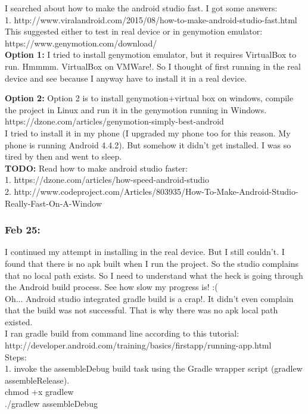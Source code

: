 \documentclass[11pt]{article}
\begin{document}
I searched about how to make the android studio fast. I got some answers:\\
1. http://www.viralandroid.com/2015/08/how-to-make-android-studio-fast.html\\
This suggested either to test in real device or in genymotion emulator: https://www.genymotion.com/download/\\

\textbf{Option 1: } I tried to install genymotion emulator, but it requires VirtualBox to run. Hmmmm. VirtualBox on VMWare!. So I thought of 
first running in the real device and see because I anyway have to install it in a real device.

\textbf{Option 2: } Option 2 is to install genymotion+virtual box on windows, compile the project in Linux and run it in the genymotion 
running in Windows. https://dzone.com/articles/genymotion-simply-best-android \\

I tried to install it in my phone (I upgraded my phone too for this reason. My phone is running Android 4.4.2). But somehow it didn't get installed.
I was so tired by then and went to sleep.\\

\textbf{TODO:}
Read how to make android studio faster:\\
1. https://dzone.com/articles/how-speed-android-studio\\
2. http://www.codeproject.com/Articles/803935/How-To-Make-Android-Studio-Really-Fast-On-A-Window\\


\subsubsection*{Feb 25:}
I continued my attempt in installing in the real device. But I still couldn't.
I found that there is no apk built when I run the project. So the studio complains that no local path exists. So I need to understand what the heck 
is going through the Android build process. See how slow my progress is! :(\\

Oh... Android studio integrated gradle build is a crap!. It didn't even complain that the build was not successful. That is why there was no apk 
local path existed.\\

I ran gradle build from command line according to this tutorial: http://developer.android.com/training/basics/firstapp/running-app.html\\
Steps: \\
1. invoke the assembleDebug build task using the Gradle wrapper script (gradlew assembleRelease).\\
chmod +x gradlew\\
./gradlew assembleDebug\\
\end{document}
